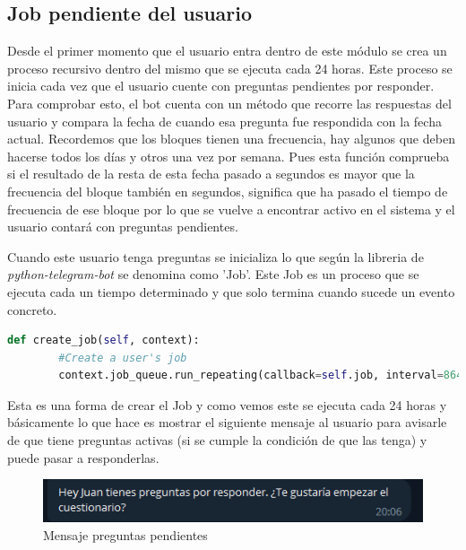 \subsection{Job pendiente del usuario}

Desde el primer momento que el usuario entra dentro de este módulo se crea un proceso recursivo dentro del mismo que se ejecuta cada 24 horas. Este proceso se inicia cada vez que el usuario cuente con preguntas pendientes por responder. Para comprobar esto, el bot cuenta con un método que recorre las respuestas del usuario y compara la fecha de cuando esa pregunta fue respondida con la fecha actual. Recordemos que los bloques tienen una frecuencia, hay algunos que deben hacerse todos los días y otros una vez por semana. Pues esta función comprueba si el resultado de la resta de esta fecha pasado a segundos es mayor que la frecuencia del bloque también en segundos, significa que ha pasado el tiempo de frecuencia de ese bloque por lo que se vuelve a encontrar activo en el sistema y el usuario contará con preguntas pendientes. 

Cuando este usuario tenga preguntas se inicializa lo que según la libreria de \textit{python-telegram-bot} se denomina como 'Job'. Este Job es un proceso que se ejecuta cada un tiempo determinado y que solo termina cuando sucede un evento concreto. 

\begin{lstlisting}[language=Python]
    def create_job(self, context):
        #Create a user's job
        context.job_queue.run_repeating(callback=self.job, interval=86400, first=0, context=self.suscriber.chatid, name=self.suscriber.chatid)
\end{lstlisting}

Esta es una forma de crear el Job y como vemos este se ejecuta cada 24 horas y básicamente lo que hace es mostrar el siguiente mensaje al usuario para avisarle de que tiene preguntas activas (si se cumple la condición de que las tenga) y puede pasar a responderlas.

\begin{figure}[!ht]
    \centering
    \includegraphics[width=1\textwidth]{imagenes/mensaje_preguntasactivas.png}
    \caption{ Mensaje preguntas pendientes }
    \label{fig:enter-label}
\end{figure}\vspace{0.3cm}

